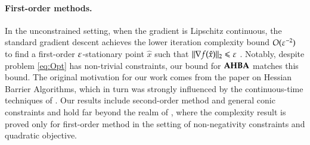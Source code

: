 \paragraph{First-order methods.} In the unconstrained setting, when the gradient is Lipschitz continuous, the standard gradient descent achieves the lower iteration complexity bound $O(\varepsilon^{-2})$ to find a first-order $\varepsilon$-stationary point $\hat{x}$ such that $\lVert\nabla f(\hat{x})\rVert_2 \leqslant\varepsilon$  \cite{Nes18,CarDucHinSid19b,CarDucHinSid19}. 
Notably, despite problem \eqref{eq:Opt} has non-trivial constraints, our bound for $\operatorname{\mathbf{AHBA}}$ matches this bound.
The original motivation for our work comes from the paper \cite{HBA-linear} on Hessian Barrier Algorithms, which in turn was strongly influenced by the continuous-time techniques of \cite{ABB04,BolTeb03}. Our results include second-order method and general conic constraints and hold far beyond the realm of \cite{HBA-linear}, where the complexity result is proved only for first-order method in the setting of non-negativity constraints and quadratic objective.
